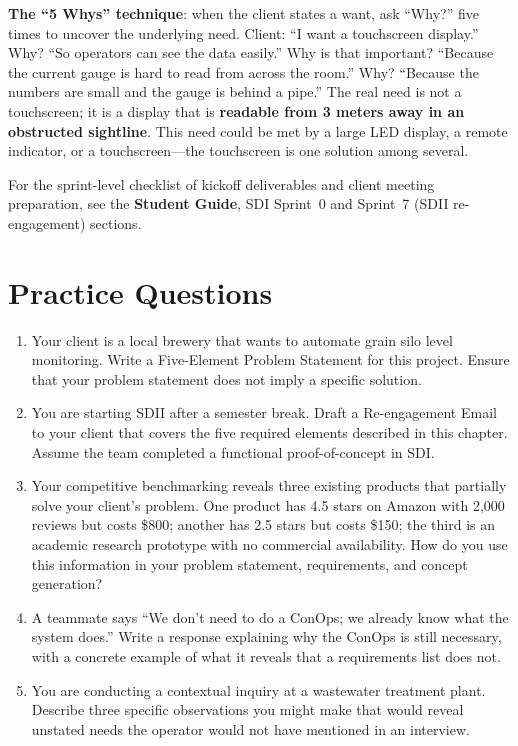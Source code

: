 \textbf{The ``5 Whys'' technique}: when the client states a want, ask ``Why?'' five times to uncover the underlying need. Client: ``I want a touchscreen display.'' Why? ``So operators can see the data easily.'' Why is that important? ``Because the current gauge is hard to read from across the room.'' Why? ``Because the numbers are small and the gauge is behind a pipe.'' The real need is not a touchscreen; it is a display that is \textbf{readable from 3 meters away in an obstructed sightline}. This need could be met by a large LED display, a remote indicator, or a touchscreen---the touchscreen is one solution among several.


\begin{tipbox}
For the sprint-level checklist of kickoff deliverables and client meeting preparation, see the \textbf{Student Guide}, SDI Sprint~0 and Sprint~7 (SDII re-engagement) sections.
\end{tipbox}

\section{Practice Questions}
\begin{enumerate}[leftmargin=1.5em]
\item Your client is a local brewery that wants to automate grain silo level monitoring. Write a Five-Element Problem Statement for this project. Ensure that your problem statement does not imply a specific solution.
\item You are starting SDII after a semester break. Draft a Re-engagement Email to your client that covers the five required elements described in this chapter. Assume the team completed a functional proof-of-concept in SDI.
\item Your competitive benchmarking reveals three existing products that partially solve your client's problem. One product has 4.5 stars on Amazon with 2,000 reviews but costs \$800; another has 2.5 stars but costs \$150; the third is an academic research prototype with no commercial availability. How do you use this information in your problem statement, requirements, and concept generation?
\item A teammate says ``We don't need to do a ConOps; we already know what the system does.'' Write a response explaining why the ConOps is still necessary, with a concrete example of what it reveals that a requirements list does not.
\item You are conducting a contextual inquiry at a wastewater treatment plant. Describe three specific observations you might make that would reveal unstated needs the operator would not have mentioned in an interview.
\end{enumerate}


